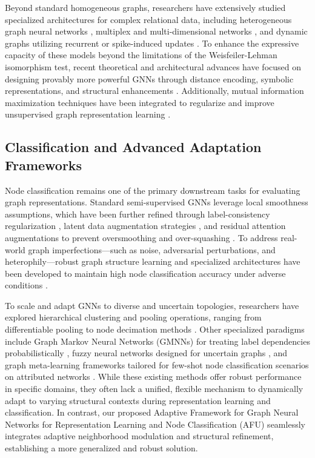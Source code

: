 \documentclass[10pt,twocolumn]{article}
\begin{document}
Beyond standard homogeneous graphs, researchers have extensively studied specialized architectures for complex relational data, including heterogeneous graph neural networks \cite{target_ref, ref_24}, multiplex and multi-dimensional networks \cite{ref_16, ref_27}, and dynamic graphs utilizing recurrent or spike-induced updates \cite{ref_10, ref_12}. To enhance the expressive capacity of these models beyond the limitations of the Weisfeiler-Lehman isomorphism test, recent theoretical and architectural advances have focused on designing provably more powerful GNNs through distance encoding, symbolic representations, and structural enhancements \cite{ref_3, ref_14, ref_19, ref_20}. Additionally, mutual information maximization techniques have been integrated to regularize and improve unsupervised graph representation learning \cite{ref_13}.

\subsection{Classification and Advanced Adaptation Frameworks}
Node classification remains one of the primary downstream tasks for evaluating graph representations. Standard semi-supervised GNNs leverage local smoothness assumptions, which have been further refined through label-consistency regularization \cite{ref_21}, latent data augmentation strategies \cite{ref_28}, and residual attention augmentations to prevent oversmoothing and over-squashing \cite{ref_36}. To address real-world graph imperfections—such as noise, adversarial perturbations, and heterophily—robust graph structure learning and specialized architectures have been developed to maintain high node classification accuracy under adverse conditions \cite{ref_23, ref_37}.

To scale and adapt GNNs to diverse and uncertain topologies, researchers have explored hierarchical clustering and pooling operations, ranging from differentiable pooling to node decimation methods \cite{ref_7, ref_33, ref_30}. Other specialized paradigms include Graph Markov Neural Networks (GMNNs) for treating label dependencies probabilistically \cite{ref_15}, fuzzy neural networks designed for uncertain graphs \cite{ref_35}, and graph meta-learning frameworks tailored for few-shot node classification scenarios on attributed networks \cite{ref_31}. While these existing methods offer robust performance in specific domains, they often lack a unified, flexible mechanism to dynamically adapt to varying structural contexts during representation learning and classification. In contrast, our proposed Adaptive Framework for Graph Neural Networks for Representation Learning and Node Classification (\textsc{AFU}) seamlessly integrates adaptive neighborhood modulation and structural refinement, establishing a more generalized and robust solution.
\end{document}
